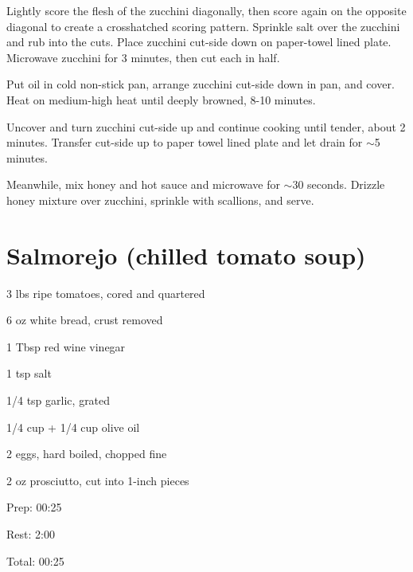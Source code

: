 \documentclass[oneside]{book}  %
\def\thisrecipe{}  %
\newcommand{\recipe}[1]{\section{#1}\def\thisrecipe{: #1}} %
\newcommand{\about}{$\sim$}
\begin{document}
\begin{directions}
  \item Lightly score the flesh of the zucchini diagonally, then score again on
  the opposite diagonal to create a crosshatched scoring pattern. Sprinkle salt
  over the zucchini and rub into the cuts. Place zucchini cut-side down on
  paper-towel lined plate. Microwave zucchini for 3 minutes, then cut each in
  half.

  \item Put oil in cold non-stick pan, arrange zucchini cut-side down in pan,
  and cover. Heat on medium-high heat until deeply browned, 8-10 minutes.

  \item Uncover and turn zucchini cut-side up and continue cooking until tender,
  about 2 minutes. Transfer cut-side up to paper towel lined plate and let drain
  for \about 5 minutes.

  \item Meanwhile, mix honey and hot sauce and microwave for \about 30 seconds.
  Drizzle honey mixture over zucchini, sprinkle with scallions, and serve.
\end{directions}
\recipe{Salmorejo (chilled tomato soup)} \label{recipe:salmorejo} %
 

\begin{IT}
  \begin{ingredients}
    \item[3 lbs] ripe tomatoes, cored and quartered
    \item[6 oz] white bread, crust removed
    \item[1 Tbsp] red wine vinegar
    \item[1 tsp] salt
    \item[1/4 tsp] garlic, grated
    \item[1/4 cup + 1/4 cup] olive oil
    \item[2] eggs, hard boiled, chopped fine
    \item[2 oz] prosciutto, cut into 1-inch pieces
  \end{ingredients}

  \switchcolumn

  \begin{timeline}
    \item[Prep:]  00:25
    \item[Rest:]  2:00
    \item[Total:] 00:25
  \end{timeline}
\end{IT}
\end{document}

